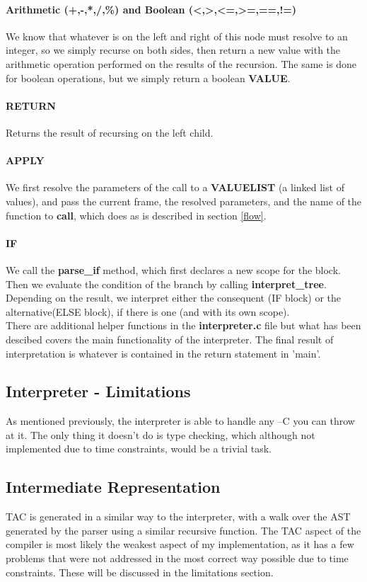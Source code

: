 \documentclass[12pt]{article}
\begin{document}
\paragraph{Arithmetic (+,-,*,/,\%) and Boolean (<,>,<=,>=,==,!=)} We know that whatever is on the left and right of this node must resolve to an integer, so we simply recurse on both sides, then return a new value with the arithmetic operation performed on the results of the recursion. The same is done for boolean operations, but we simply return a boolean \textbf{VALUE}.
\paragraph{RETURN} Returns the result of recursing on the left child.
\paragraph{APPLY} We first resolve the parameters of the call to a \textbf{VALUELIST} (a linked list of values), and pass the current frame, the resolved parameters, and the name of the function to \textbf{call}, which does as is described in section \ref{flow}.
\paragraph{IF} We call the \textbf{parse\_if} method, which first declares a new scope for the block. Then we evaluate the condition of the branch by calling \textbf{interpret\_tree}. Depending on the result, we interpret either the consequent (IF block) or the alternative(ELSE block), if there is one (and with its own scope).
\\\newline There are additional helper functions in the \textbf{interpreter.c} file but what has been descibed covers the main functionality of the interpreter. The final result of interpretation is whatever is contained in the return statement in 'main'.
\subsection{Interpreter - Limitations}
As mentioned previously, the interpreter is able to handle any --C you can throw at it. The only thing it doesn't do is type checking, which although not implemented due to time constraints, would be a trivial task.
\subsection{Intermediate Representation}\label{inmed}
TAC is generated in a similar way to the interpreter, with a walk over the AST generated by the parser using a similar recursive function. The TAC aspect of the compiler is most likely the weakest aspect of my implementation, as it has a few problems that were not addressed in the most correct way possible due to time constraints. These will be discussed in the limitations section.
\end{document}
